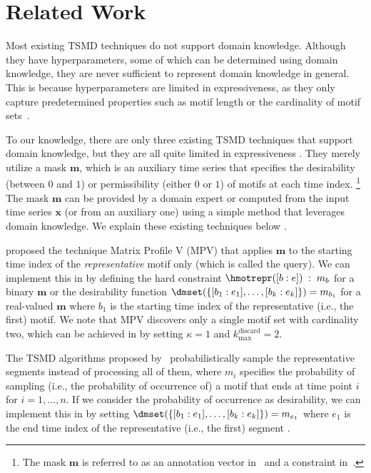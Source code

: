 \section{Related Work}
\label{sec:related_work}

%
%
%
%
%
%
%
%
%
%
Most existing TSMD techniques do not support domain knowledge. 
Although they have hyperparameters, some of which can be determined using domain knowledge, they are never sufficient to represent domain knowledge in general. 
This is because hyperparameters are limited in expressiveness, as they only capture predetermined properties such as motif length or the cardinality of motif sets~\citep{locomotif,motiflets}. %
%
%
%
%
%
%


%
%
%
%

%
%
%

%
%


%
%
%

To our knowledge, there are only three existing TSMD techniques that support domain knowledge, but they are all quite limited in expressiveness%
. 
They merely utilize a mask $\mathbf{m}$, which is an auxiliary time series that specifies the desirability (between $0$ and $1$) or permissibility (either $0$ or $1$) of motifs at each time index.%
\footnote{The mask $\mathbf{m}$ is referred to as an annotation vector in~\cite{guiding} and a constraint in~\cite{mohammad2009constrained}.} 
The mask $\mathbf{m}$ can be provided by a domain expert or computed from the input time series $\mathbf{x}$ (or from an auxiliary one) using a simple method that leverages domain knowledge. 
We explain these existing techniques below%
.

%
%
%
\cite{guiding} proposed the technique Matrix Profile V (MPV) that applies $\textbf{m}$ to the starting time index of the \textit{representative} motif only (which is called the query). 
We can implement this in \locomotifdok by defining 
the hard constraint $\hmotrepr([b:e]) \;:\; m_b$ %
for a binary $\mathbf{m}$ 
or
the desirability function $\dmset(\{ [b_1 : e_1], \ldots, [b_k : e_k] \}) = m_{b_1}$ for a real-valued $\mathbf{m}$ 
where $b_1$ is the starting time index of the representative (i.e., the first) motif. 
We note that
%
MPV discovers only a single motif set with cardinality two, which can be achieved in \locomotifdok by setting $\kappa=1$ and $k_\mathrm{max}^\text{discard}=2$.

%
%
%
%
%
%
%

%
%
The TSMD algorithms proposed by~\cite{mohammad2009constrained} probabilistically sample the representative segments %
instead of processing all of them, where
%
$m_i$ specifies the probability of sampling (i.e., the probability of occurrence of) a motif that ends at time point $i$ 
for $i=1,\ldots,n$. 
If we consider the probability of occurrence as desirability, we can implement this in \locomotifdok by setting 
%
$\dmset(\{ [b_1 : e_1], \ldots, [b_k : e_k] \}) = m_{e_1}$ 
where $e_1$ is the end time index of the representative (i.e., the first) segment%
.
%
%
%
%
%
%

